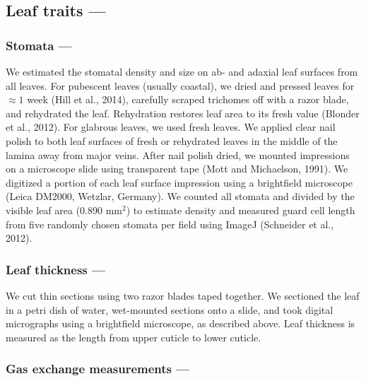 \documentclass[
  letterpaper,
  DIV=11,
  numbers=noendperiod]{scrartcl}
\begin{document}
\hypertarget{leaf-traits}{%
\subsection{Leaf traits ---}\label{leaf-traits}}

\hypertarget{stomata}{%
\subsubsection{Stomata ---}\label{stomata}}

We estimated the stomatal density and size on ab- and adaxial leaf
surfaces from all leaves. For pubescent leaves (usually coastal), we
dried and pressed leaves for \(\approx 1\) week (Hill et al., 2014),
carefully scraped trichomes off with a razor blade, and rehydrated the
leaf. Rehydration restores leaf area to its fresh value (Blonder et al.,
2012). For glabrous leaves, we used fresh leaves. We applied clear nail
polish to both leaf surfaces of fresh or rehydrated leaves in the middle
of the lamina away from major veins. After nail polish dried, we mounted
impressions on a microscope slide using transparent tape (Mott and
Michaelson, 1991). We digitized a portion of each leaf surface
impression using a brightfield microscope (Leica DM2000, Wetzlar,
Germany). We counted all stomata and divided by the visible leaf area
(0.890 mm\(^2\)) to estimate density and measured guard cell length from
five randomly chosen stomata per field using ImageJ (Schneider et al.,
2012).

\hypertarget{leaf-thickness}{%
\subsubsection{Leaf thickness ---}\label{leaf-thickness}}

We cut thin sections using two razor blades taped together. We sectioned
the leaf in a petri dish of water, wet-mounted sections onto a slide,
and took digital micrographs using a brightfield microscope, as
described above. Leaf thickness is measured as the length from upper
cuticle to lower cuticle.

\hypertarget{gas-exchange-measurements}{%
\subsubsection{Gas exchange measurements
---}\label{gas-exchange-measurements}}
\end{document}
